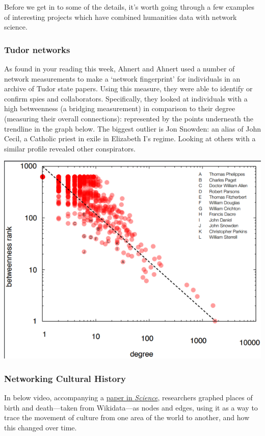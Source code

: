 \documentclass[
]{book}
\begin{document}
Before we get in to some of the details, it's worth going through a few examples of interesting projects which have combined humanities data with network science.

\hypertarget{tudor-networks}{%
\subsubsection{Tudor networks}\label{tudor-networks}}

As found in your reading this week, Ahnert and Ahnert used a number of network measurements to make a `network fingerprint' for individuals in an archive of Tudor state papers. Using this measure, they were able to identify or confirm spies and collaborators. Specifically, they looked at individuals with a high betweenness (a bridging measurement) in comparison to their degree (measuring their overall connections): represented by the points underneath the trendline in the graph below. The biggest outlier is Jon Snowden: an alias of John Cecil, a Catholic priest in exile in Elizabeth I's regime. Looking at others with a similar profile revealed other conspirators.

\includegraphics{images/Screenshot 2022-10-03 at 11.42.11.png}

\hypertarget{networking-cultural-history}{%
\subsubsection{Networking Cultural History}\label{networking-cultural-history}}

In below video, accompanying a \href{https://www.science.org/doi/10.1126/science.1240064}{paper in \emph{Science}}, researchers graphed places of birth and death---taken from Wikidata---as nodes and edges, using it as a way to trace the movement of culture from one area of the world to another, and how this changed over time.
\end{document}
